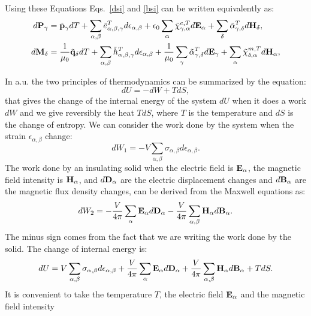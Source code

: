 \documentclass[12pt,a4paper,twoside]{report}
\begin{document}
Using these Equations Eqs.~\ref{dsi} and \ref{bsi} can be written
equivalently as:
\begin{align}
d{\bf P}_\gamma&=
\tilde {\bf p}_\gamma dT + \sum_{\alpha,\beta} \tilde 
e^T_{\alpha,\beta,\gamma} d\epsilon_{\alpha,\beta}
+\epsilon_0 \sum_\alpha \tilde \chi^{e,T}_{\gamma,\alpha} 
d{\bf E}_{\alpha} + 
\sum_\delta \tilde \alpha^T_{\gamma,\delta} d{\bf H}_{\delta}, \\
d{\bf M}_\delta&=
{1\over \mu_0}\tilde {\bf q}_\delta dT+ \sum_{\alpha,\beta}
\tilde h^T_{\alpha,\beta,\gamma}
d\epsilon_{\alpha,\beta}
+{1\over \mu_0}\sum_\gamma \tilde \alpha^T_{\gamma,\delta}
d{\bf E}_{\gamma}+ 
\sum_\alpha \tilde \chi^{m,T}_{\delta,\alpha}
d{\bf H}_{\alpha}, 
\end{align}

\newpage
{\color{web-blue}
In a.u. the two principles of thermodynamics can be summarized by the equation:
\begin{equation}
dU = -dW + T dS,
\end{equation}
that gives the change of the internal energy of the system $dU$ when
it does a work $dW$ and we give reversibly the heat $T dS$, where $T$ 
is the temperature and $dS$ is the change of entropy.
We can consider the work done by the system when the strain
$\epsilon_{\alpha,\beta}$ change:
\begin{equation}
dW_1 =-V \sum_{\alpha,\beta} \sigma_{\alpha,\beta} d \epsilon_{\alpha,\beta}. 
\end{equation}
The work done by an insulating solid when the electric field is 
${\bf E}_\alpha$, the magnetic field intensity is ${\bf H}_\alpha$, 
and $d {\bf D}_\alpha$ are the electric displacement changes and 
$d {\bf B}_\alpha$ are the magnetic flux density changes, can be derived
from the Maxwell equations as: 
\begin{equation}
dW_2 = -{V \over 4 \pi} \sum_\alpha {\bf E}_\alpha d {\bf D}_\alpha 
-{V \over 4 \pi} \sum_{\alpha,\beta} {\bf H}_{\alpha} d {\bf B}_\alpha.
\end{equation}
The minus sign comes from the fact that we are writing the work done by the
solid. The change of internal energy is:
\begin{equation}
dU = V \sum_{\alpha,\beta} \sigma_{\alpha,\beta} d \epsilon_{\alpha,\beta}
+ {V\over 4 \pi} \sum_\alpha {\bf E}_\alpha d {\bf D}_\alpha + 
{V \over 4 \pi} \sum_{\alpha,\beta} {\bf H}_{\alpha} d {\bf B}_\alpha + T dS.
\end{equation}
It is convenient to take the temperature $T$,
the electric field ${\bf E}_\alpha$ and the magnetic field intensity
}
\end{document}
